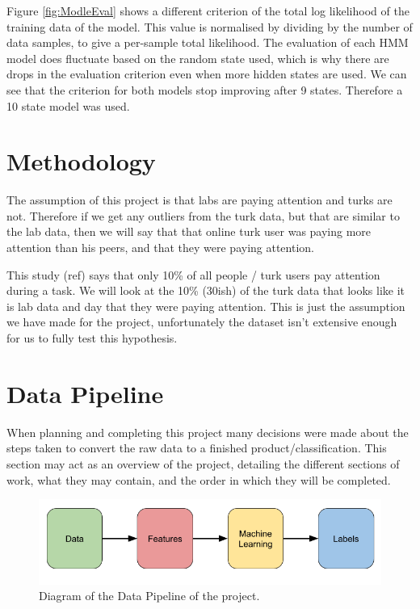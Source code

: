 \documentclass{article}
\begin{document}
Figure \ref{fig:ModleEval} shows a different criterion of the total log likelihood of the training data of the model.
This value is normalised by dividing by the number of data samples, to give a per-sample total likelihood.
The evaluation of each HMM model does fluctuate based on the random state used, which is why there are drops in the evaluation criterion even when more hidden states are used.
We can see that the criterion for both models stop improving after 9 states.
Therefore a 10 state model was used.


\section{Methodology}

 The assumption of this project is that labs are paying attention and turks are not. Therefore if we get any outliers from the turk data, but that are similar to the lab data, then we will say that that online turk user was paying more attention than his peers, and that they were paying attention.

This study (ref) says that only 10\% of all people / turk users pay attention during a task.
We will look at the 10\% (30ish) of the turk data that looks like it is lab data and day that they were paying attention.
This is just the assumption we have made for the project, 
unfortunately the dataset isn't extensive enough for us to fully test this hypothesis.

\section{Data Pipeline}

When planning and completing this project many decisions were made about the steps taken to convert the raw data to a finished product/classification.
This section may act as an overview of the project, detailing the different sections of work, what they may contain, and the order in which they will be completed.

\begin{figure}[ht]
    \centering
    \includegraphics[scale=0.55]{Images/Data-Pipeline.png}
    \caption{Diagram of the Data Pipeline of the project.}
    \label{fig:test}
\end{figure}
\end{document}

